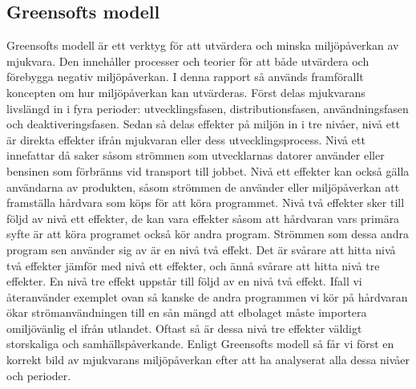 \subsection*{Greensofts modell}
Greensofts modell är ett verktyg för att utvärdera och minska miljöpåverkan av mjukvara. Den innehåller processer och teorier för att både utvärdera och förebygga negativ miljöpåverkan. I denna rapport så används framförallt koncepten om hur miljöpåverkan kan utvärderas. Först delas mjukvarans livslängd in i fyra perioder: utvecklingsfasen, distributionsfasen, användningsfasen och deaktiveringsfasen. Sedan så delas effekter på miljön in i tre nivåer, nivå ett är direkta effekter ifrån mjukvaran eller dess utvecklingsprocess. Nivå ett innefattar då saker såsom strömmen som utvecklarnas datorer använder eller bensinen som förbränns vid transport till jobbet. Nivå ett effekter kan också gälla användarna av produkten, såsom strömmen de använder eller miljöpåverkan att framställa hårdvara som köps för att köra programmet. Nivå två effekter sker till följd av nivå ett effekter, de kan vara effekter såsom att hårdvaran vars primära syfte är att köra programet också kör andra program. Strömmen som dessa andra program sen använder sig av är en nivå två effekt. Det är svårare att hitta nivå två effekter jämför med nivå ett effekter, och ännå svårare att hitta nivå tre effekter. En nivå tre effekt uppstår till följd av en nivå två effekt. Ifall vi återanvänder exemplet ovan så kanske de andra programmen vi kör på hårdvaran ökar strömanvändningen till en sån mängd att elbolaget måste importera omiljövänlig el ifrån utlandet. Oftast så är dessa nivå tre effekter väldigt storskaliga och samhällspåverkande. Enligt Greensofts modell så får vi först en korrekt bild av mjukvarans miljöpåverkan efter att ha analyserat alla dessa nivåer och perioder. ~\cite{greensoft}